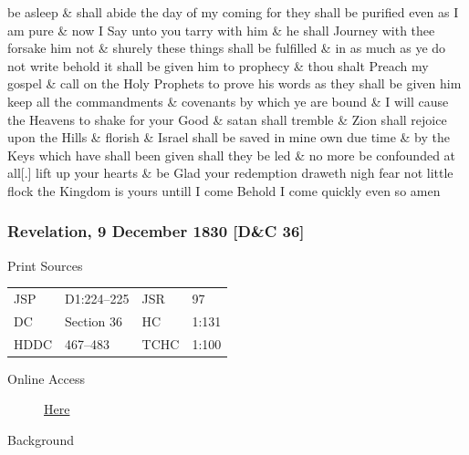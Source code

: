 be asleep \& shall abide the day of my coming for they shall be purified even as I am pure \& now I Say unto you tarry with him \& he shall Journey with thee forsake him not \& shurely these things shall be fulfilled \& in as much as ye do not write behold it shall be given him to prophecy \& thou shalt Preach my gospel \& call on the Holy Prophets to prove his words as they shall be given him keep all the commandments \& covenants by which ye are bound \& I will cause the Heavens to shake for your Good \& satan shall tremble \& Zion shall rejoice upon the Hills \& florish \& Israel shall be saved in mine own due time \& by the Keys which have shall been given shall they be led \& no more be confounded at all[.] lift up your hearts \& be Glad your redemption draweth nigh fear not little flock the Kingdom is yours untill I come Behold I come quickly even so amen
				
		\subsubsection{Revelation, 9 December 1830 [D\&C 36]}
			\label{EMS-1830-JS-9-DEC-1830}
		
			\begin{description}
				\item[Print Sources]
			\end{description}

				\begin{tabular}{p{0.5in}p{1in}p{0.5in}p{1in}}
				JSP	 	& D1:224--225	& JSR 		& 97	 \\
				DC	 	& Section 36	& HC 		& 1:131 \\
				HDDC 	& 467--483		& TCHC 		& 1:100 \\
				\end{tabular}
			
			\begin{description}
				\item[Online Access] \href{https://www.josephsmithpapers.org/paper-summary/revelation-9-december-1830-dc-36/1}{Here}
			\end{description}
			
			\begin{description}
				\item[Background]
			\end{description}
			
